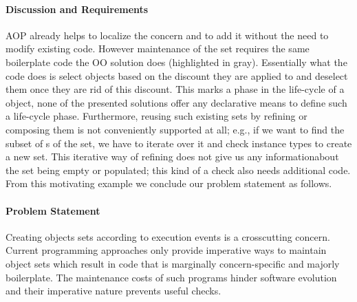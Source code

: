 \paragraph{Discussion and Requirements}

AOP already helps to localize the concern and to add it without the need to modify existing code.
However maintenance of the  set requires the same boilerplate code the OO solution does (highlighted in gray).
Essentially what the code does is select  objects based on the discount they are applied to and deselect them once they are rid of this discount. 
This marks a phase in the life-cycle of a  object, none of the presented solutions offer any declarative means to define such a life-cycle phase.
Furthermore, reusing such existing sets by refining or composing them is not conveniently supported at all; e.g., if we want to find the subset of s of the  set, we have to iterate over it and check instance types to create a new set. This iterative way of refining does not give us any informationabout the set being empty or populated; this kind of a check also needs additional code. From this motivating example we conclude our problem statement as follows.

\paragraph{Problem Statement}
Creating objects sets according to execution events is a crosscutting concern. Current programming approaches only provide imperative ways to maintain object sets which result in code that is marginally concern-specific and majorly boilerplate. The maintenance costs of such programs hinder software evolution and their imperative nature prevents useful checks.







